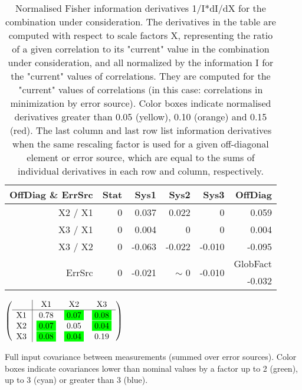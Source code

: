 \begin{table}[H]
\scriptsize
\begin{center}
\renewcommand{\arraystretch}{1.1}
\begin{tabular}{|r|rrrr|r|}
\hline
 OffDiag \& ErrSrc & {\tiny Stat} & {\tiny Sys1} & {\tiny Sys2} & {\tiny Sys3} & OffDiag\\
\hline
X2 / X1 &  0 &      0.037 &      0.022 &  0 &  \colorbox{Yellow1}{    0.059} \\
X3 / X1 &  0 &      0.004 &  0 &  0 &      0.004 \\
X3 / X2 &  0 &     -0.063 &     -0.022 &     -0.010 &     -0.095 \\
\hline
\multirow{2}{*}{ErrSrc} & \multirow{2}{*}{ 0} & \multirow{2}{*}{    -0.021} & \multirow{2}{*}{ {\tiny $\sim$ }0} & \multirow{2}{*}{    -0.010} & GlobFact\\
 & & & & &     -0.032 \\
\hline
\end{tabular}
\renewcommand{\arraystretch}{1}
\caption{Normalised Fisher information derivatives 1/I*dI/dX for the combination under consideration. The derivatives in the table are computed with respect to scale factors X, representing the ratio of a given correlation to its "current" value in the combination under consideration, and all normalized by the information I for the "current" values of correlations. They are computed for the "current" values of correlations (in this case: correlations in minimization by error source). Color boxes indicate normalised derivatives greater than 0.05 (yellow), 0.10 (orange) and 0.15 (red). The last column and last row list information derivatives when the same rescaling factor is used for a given off-diagonal element or error source, which are equal to the sums of individual derivatives in each row and column, respectively.}
\end{center}
\end{table}
\begin{table}[H]
\scriptsize
\begin{center}
\renewcommand{\arraystretch}{1.1}
\begin{math}\left(\begin{array}{c|ccc}
 & \mathrm{X1} & 
\mathrm{X2} & 
\mathrm{X3} \\
\hline
\mathrm{X1} \hspace*{2pt} &       0.78 &  \colorbox{Green1}{$      0.07$} &  \colorbox{Green1}{$      0.08$} \\
\mathrm{X2} \hspace*{2pt} &  \colorbox{Green1}{$      0.07$} &       0.05 &  \colorbox{Green1}{$      0.04$} \\
\mathrm{X3} \hspace*{2pt} &  \colorbox{Green1}{$      0.08$} &  \colorbox{Green1}{$      0.04$} &       0.19 \\
\end{array}\right)\end{math}
\caption{Full input covariance between measurements (summed over error sources). Color boxes indicate covariances lower than nominal values by a factor up to 2 (green), up to 3 (cyan) or greater than 3 (blue).}
\renewcommand{\arraystretch}{1}
\end{center}
\end{table}
